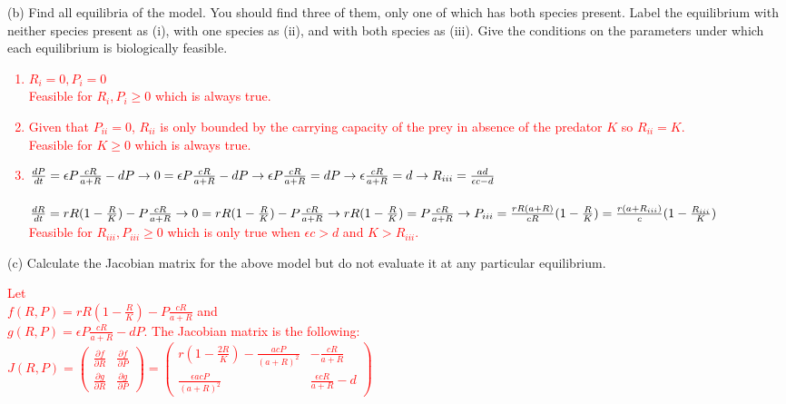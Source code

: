 \documentclass[11pt]{article}
\begin{document}
(b) Find all equilibria of the model. You should find three of them, only one of which has both species present. Label the equilibrium with neither species present as (i), with one species as (ii), and with both species as (iii). Give the conditions on the parameters under which each equilibrium is biologically feasible. 
\textcolor{red}{
\begin{enumerate}\renewcommand{\labelenumi}{(\roman{enumi})}
    \item $R_{i} = 0, P_{i} = 0$\\
        Feasible for $R_{i}, P_{i} \ge 0$ which is always true.
    \item Given that $P_{ii} = 0$, $R_{ii}$ is only bounded by the
        carrying capacity of the prey in absence of the predator $K$ so $R_{ii} = K$.\\
        Feasible for $K \ge 0$ which is always true.
    \item $\frac{dP}{dt} = \epsilon P \frac{cR}{a+R} -dP \\\rightarrow
        0 = \epsilon P \frac{cR}{a+R} -dP \\\rightarrow
        \epsilon P \frac{cR}{a+R} = dP \\\rightarrow
        \epsilon \frac{cR}{a+R} = d \\\rightarrow
        R_{iii} = \frac{ad}{\epsilon c - d}$\\\\
        $\frac{dR}{dt} = rR(1-\frac{R}{K})-P \frac{cR}{a+R} \\\rightarrow
        0 = rR(1-\frac{R}{K})-P \frac{cR}{a+R} \\\rightarrow
        rR(1-\frac{R}{K}) = P \frac{cR}{a+R} \\\rightarrow
        P_{iii} = \frac{rR(a + R)}{cR}(1 - \frac{R}{K}) = \frac{r(a + R_{iii})}{c}(1 - \frac{R_{iii}}{K})$\\
        Feasible for $R_{iii}, P_{iii} \ge 0$ which is only true when $\epsilon c > d$ and $K > R_{iii}$.
\end{enumerate}
}

(c) Calculate the Jacobian matrix for the above model but do not evaluate it at any particular equilibrium. 

\textcolor{red}{
Let \\
$f(R, P) = rR\left(1 - \frac{R}{K}\right) - P\frac{cR}{a+R}$ and \\
$g(R, P) = \epsilon P \frac{cR}{a+R} - dP$. The Jacobian matrix is the following:\\
$J(R, P) = 
\begin{pmatrix} \frac{\partial f}{\partial R} & \frac{\partial f}{\partial P} \\ \frac{\partial g}{\partial R} & \frac{\partial g}{\partial P} \end{pmatrix} = 
\begin{pmatrix} r\left(1 - \frac{2R}{K}\right) - \frac{acP}{(a+R)^2} & -\frac{cR}{a+R} \\ \frac{\epsilon ac P}{(a+R)^2} & \frac{\epsilon cR}{a+R} - d \end{pmatrix}$
}
\end{document}
